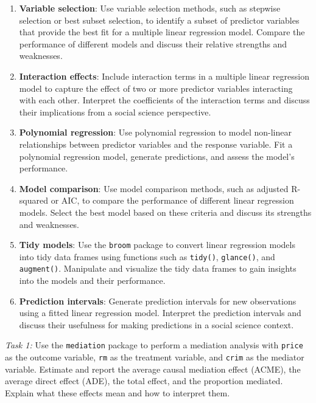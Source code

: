 \documentclass[
]{book}
\providecommand{\tightlist}{%
  \setlength{\itemsep}{0pt}\setlength{\parskip}{0pt}}
\begin{document}
\begin{enumerate}
\def\labelenumi{\arabic{enumi}.}
\tightlist
\item
  \textbf{Variable selection}: Use variable selection methods, such as stepwise selection or best subset selection, to identify a subset of predictor variables that provide the best fit for a multiple linear regression model. Compare the performance of different models and discuss their relative strengths and weaknesses.
\item
  \textbf{Interaction effects}: Include interaction terms in a multiple linear regression model to capture the effect of two or more predictor variables interacting with each other. Interpret the coefficients of the interaction terms and discuss their implications from a social science perspective.
\item
  \textbf{Polynomial regression}: Use polynomial regression to model non-linear relationships between predictor variables and the response variable. Fit a polynomial regression model, generate predictions, and assess the model's performance.
\item
  \textbf{Model comparison}: Use model comparison methods, such as adjusted R-squared or AIC, to compare the performance of different linear regression models. Select the best model based on these criteria and discuss its strengths and weaknesses.
\item
  \textbf{Tidy models}: Use the \texttt{broom} package to convert linear regression models into tidy data frames using functions such as \texttt{tidy()}, \texttt{glance()}, and \texttt{augment()}. Manipulate and visualize the tidy data frames to gain insights into the models and their performance.
\item
  \textbf{Prediction intervals}: Generate prediction intervals for new observations using a fitted linear regression model. Interpret the prediction intervals and discuss their usefulness for making predictions in a social science context.
\end{enumerate}

\emph{Task 1:} Use the \texttt{mediation} package to perform a mediation analysis with \texttt{price} as the outcome variable, \texttt{rm} as the treatment variable, and \texttt{crim} as the mediator variable. Estimate and report the average causal mediation effect (ACME), the average direct effect (ADE), the total effect, and the proportion mediated. Explain what these effects mean and how to interpret them.
\end{document}
